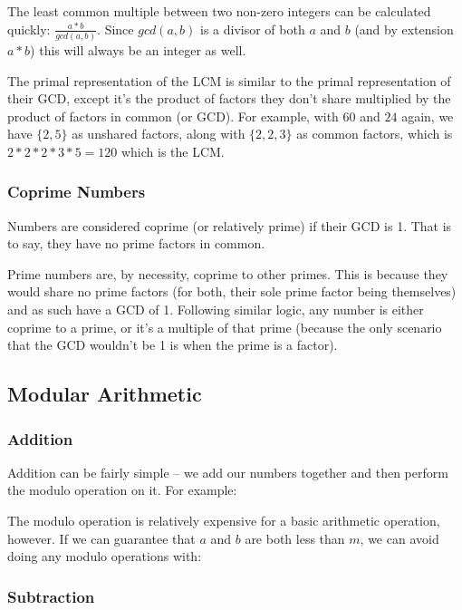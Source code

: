 The least common multiple between two non-zero integers can be calculated quickly: $\frac{a * b}{gcd(a, b)}$. Since $gcd(a, b)$ is a divisor of both $a$ and $b$ (and by extension $a * b$) this will always be an integer as well.

The primal representation of the LCM is similar to the primal representation of their GCD, except it's the product of factors they don't share multiplied by the product of factors in common (or GCD). For example, with $60$ and $24$ again, we have $\{2,5\}$ as unshared factors, along with $\{2,2,3\}$ as common factors, which is $2 * 2 * 2 * 3 * 5 = 120$ which is the LCM.

\subsubsection{Coprime Numbers}

Numbers are considered coprime (or relatively prime) if their GCD is 1. That is to say, they have no prime factors in common.

Prime numbers are, by necessity, coprime to other primes. This is because they would share no prime factors (for both, their sole prime factor being themselves) and as such have a GCD of 1. Following similar logic, any number is either coprime to a prime, or it's a multiple of that prime (because the only scenario that the GCD wouldn't be 1 is when the prime is a factor).

\subsection{Modular Arithmetic}

\subsubsection{Addition}

Addition can be fairly simple -- we add our numbers together and then perform the modulo operation on it. For example:


The modulo operation is relatively expensive for a basic arithmetic operation, however. If we can guarantee that $a$ and $b$ are both less than $m$, we can avoid doing any modulo operations with:


\subsubsection{Subtraction}

